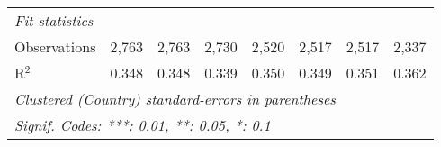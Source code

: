 \begin{tabular}{lccccccc}
   \midrule \emph{Fit statistics}\\
   Observations                                                  & 2,763          & 2,763          & 2,730          & 2,520         & 2,517         & 2,517         & 2,337\\  
   R$^2$                                                         & 0.348          & 0.348          & 0.339          & 0.350         & 0.349         & 0.351         & 0.362\\  
   \midrule
   \multicolumn{8}{l}{\emph{Clustered (Country) standard-errors in parentheses}}\\
   \multicolumn{8}{l}{\emph{Signif. Codes: ***: 0.01, **: 0.05, *: 0.1}}\\
\end{tabular}
\par\endgroup


